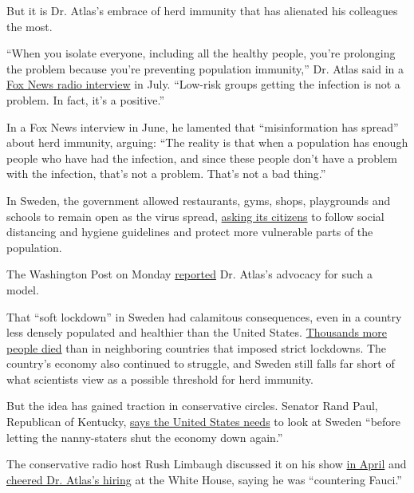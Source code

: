 But it is Dr. Atlas's embrace of herd immunity that has alienated his
colleagues the most.

``When you isolate everyone, including all the healthy people, you're
prolonging the problem because you're preventing population immunity,''
Dr. Atlas said in a
\href{https://radio.foxnews.com/2020/07/09/dr-scott-atlas-there-is-no-risk-to-children-from-covid-19-i-dont-know-why-people-deny-this/}{Fox
News radio interview} in July. ``Low-risk groups getting the infection
is not a problem. In fact, it's a positive.''

In a Fox News interview in June, he lamented that ``misinformation has
spread'' about herd immunity, arguing: ``The reality is that when a
population has enough people who have had the infection, and since these
people don't have a problem with the infection, that's not a problem.
That's not a bad thing.''

In Sweden, the government allowed restaurants, gyms, shops, playgrounds
and schools to remain open as the virus spread,
\href{https://www.nytimes3xbfgragh.onion/2020/04/28/world/europe/sweden-coronavirus-herd-immunity.html}{asking
its citizens} to follow social distancing and hygiene guidelines and
protect more vulnerable parts of the population.

The Washington Post on Monday
\href{https://www.washingtonpost.com/politics/trump-coronavirus-scott-atlas-herd-immunity/2020/08/30/925e68fe-e93b-11ea-970a-64c73a1c2392_story.html?hpid=hp_hp-banner-low_virustrump-7am\%3Ahomepage\%2Fstory-ans}{reported}
Dr. Atlas's advocacy for such a model.

That ``soft lockdown'' in Sweden had calamitous consequences, even in a
country less densely populated and healthier than the United States.
\href{https://www.nytimes3xbfgragh.onion/interactive/2020/05/15/world/europe/sweden-coronavirus-deaths.html}{Thousands
more people died} than in neighboring countries that imposed strict
lockdowns. The country's economy also continued to struggle, and Sweden
still falls far short of what scientists view as a possible threshold
for herd immunity.

But the idea has gained traction in conservative circles. Senator Rand
Paul, Republican of Kentucky,
\href{https://www.facebookcorewwwi.onion/SenatorRandPaul/posts/swedens-death-rate-was-less-than-a-third-of-new-yorks-an-important-fact-to-con}{says
the United States needs} to look at Sweden ``before letting the
nanny-staters shut the economy down again.''

The conservative radio host Rush Limbaugh discussed it on his show
\href{https://www.rushlimbaugh.com/daily/2020/04/10/two-stories-indicate-coronavirus-herd-immunity/}{in
April} and
\href{https://www.rushlimbaugh.com/daily/2020/08/10/good-news-dr-scott-atlas-added-to-coronavirus-task-force/}{cheered
Dr. Atlas's hiring} at the White House, saying he was ``countering
Fauci.''

